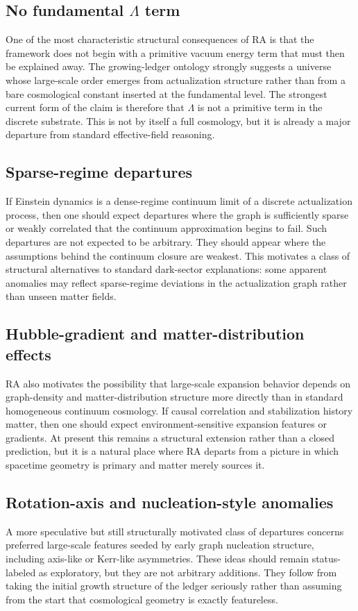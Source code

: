 \documentclass[11pt]{article}
\begin{document}
\subsection{No fundamental $\Lambda$ term}
One of the most characteristic structural consequences of RA is that the framework does not begin with a primitive vacuum energy term that must then be explained away. The growing-ledger ontology strongly suggests a universe whose large-scale order emerges from actualization structure rather than from a bare cosmological constant inserted at the fundamental level. The strongest current form of the claim is therefore that $\Lambda$ is not a primitive term in the discrete substrate. This is not by itself a full cosmology, but it is already a major departure from standard effective-field reasoning.

\subsection{Sparse-regime departures}
If Einstein dynamics is a dense-regime continuum limit of a discrete actualization process, then one should expect departures where the graph is sufficiently sparse or weakly correlated that the continuum approximation begins to fail. Such departures are not expected to be arbitrary. They should appear where the assumptions behind the continuum closure are weakest. This motivates a class of structural alternatives to standard dark-sector explanations: some apparent anomalies may reflect sparse-regime deviations in the actualization graph rather than unseen matter fields.

\subsection{Hubble-gradient and matter-distribution effects}
RA also motivates the possibility that large-scale expansion behavior depends on graph-density and matter-distribution structure more directly than in standard homogeneous continuum cosmology. If causal correlation and stabilization history matter, then one should expect environment-sensitive expansion features or gradients. At present this remains a structural extension rather than a closed prediction, but it is a natural place where RA departs from a picture in which spacetime geometry is primary and matter merely sources it.

\subsection{Rotation-axis and nucleation-style anomalies}
A more speculative but still structurally motivated class of departures concerns preferred large-scale features seeded by early graph nucleation structure, including axis-like or Kerr-like asymmetries. These ideas should remain status-labeled as exploratory, but they are not arbitrary additions. They follow from taking the initial growth structure of the ledger seriously rather than assuming from the start that cosmological geometry is exactly featureless.
\end{document}
